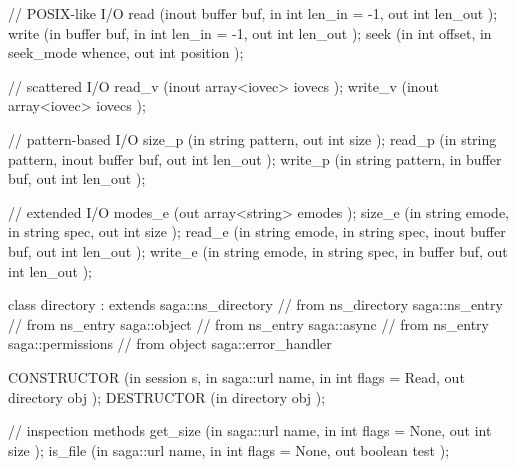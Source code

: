 \begin{myspec}
{{      // POSIX-like I/O
      read        (inout buffer            buf,
                   in    int               len_in = -1,
                   out   int               len_out  );
      write       (in    buffer            buf,
                   in    int               len_in = -1,
                   out   int               len_out  );
      seek        (in    int               offset,
                   in    seek_mode         whence,
                   out   int               position );
 
      // scattered I/O
      read_v      (inout array<iovec>      iovecs  );
      write_v     (inout array<iovec>      iovecs  );
 
      // pattern-based I/O
      size_p      (in    string            pattern,
                   out   int               size     );
      read_p      (in    string            pattern,
                   inout buffer            buf, 
                   out   int               len_out  );
      write_p     (in    string            pattern,
                   in    buffer            buf, 
                   out   int               len_out  );
 
      // extended I/O
      modes_e     (out   array<string>     emodes   );
      size_e      (in    string            emode,
                   in    string            spec,
                   out   int               size     );
      read_e      (in    string            emode,
                   in    string            spec,
                   inout buffer            buf,
                   out   int               len_out  );
      write_e     (in    string            emode,
                   in    string            spec,
                   in    buffer            buf,
                   out   int               len_out  );
    }
 
 
    class directory : extends            saga::ns_directory
                   // from ns_directory  saga::ns_entry
                   // from ns_entry      saga::object
                   // from ns_entry      saga::async
                   // from ns_entry      saga::permissions
                   // from object        saga::error_handler
    {
      CONSTRUCTOR (in    session           s,
                   in    saga::url         name,
                   in    int               flags = Read,
                   out   directory         obj      );
      DESTRUCTOR  (in    directory         obj      );
 
      // inspection methods
      get_size    (in    saga::url         name,
                   in    int               flags = None,
                   out   int               size     );
      is_file     (in    saga::url         name,
                   in    int               flags = None,
                   out   boolean           test     );
 
}}
\end{myspec}
